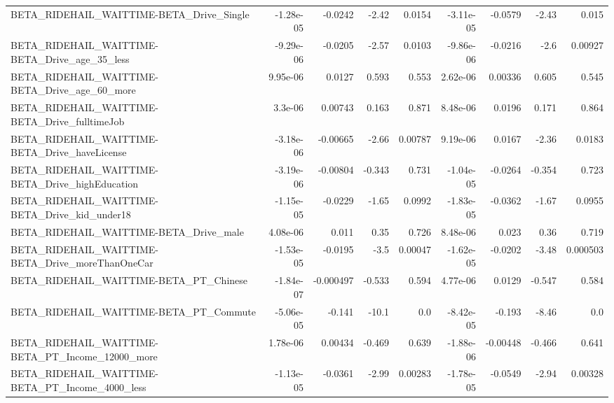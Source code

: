 \begin{tabular}{lrrrrrrrr}
BETA\_RIDEHAIL\_WAITTIME-BETA\_Drive\_Single           &   -1.28e-05 &      -0.0242 &    -2.42 &   0.0154 &  -3.11e-05 &     -0.0579 &        -2.43 &         0.015 \\
BETA\_RIDEHAIL\_WAITTIME-BETA\_Drive\_age\_35\_less      &   -9.29e-06 &      -0.0205 &    -2.57 &   0.0103 &  -9.86e-06 &     -0.0216 &         -2.6 &       0.00927 \\
BETA\_RIDEHAIL\_WAITTIME-BETA\_Drive\_age\_60\_more      &    9.95e-06 &       0.0127 &    0.593 &    0.553 &   2.62e-06 &     0.00336 &        0.605 &         0.545 \\
BETA\_RIDEHAIL\_WAITTIME-BETA\_Drive\_fulltimeJob      &     3.3e-06 &      0.00743 &    0.163 &    0.871 &   8.48e-06 &      0.0196 &        0.171 &         0.864 \\
BETA\_RIDEHAIL\_WAITTIME-BETA\_Drive\_haveLicense      &   -3.18e-06 &     -0.00665 &    -2.66 &  0.00787 &   9.19e-06 &      0.0167 &        -2.36 &        0.0183 \\
BETA\_RIDEHAIL\_WAITTIME-BETA\_Drive\_highEducation    &   -3.19e-06 &     -0.00804 &   -0.343 &    0.731 &  -1.04e-05 &     -0.0264 &       -0.354 &         0.723 \\
BETA\_RIDEHAIL\_WAITTIME-BETA\_Drive\_kid\_under18      &   -1.15e-05 &      -0.0229 &    -1.65 &   0.0992 &  -1.83e-05 &     -0.0362 &        -1.67 &        0.0955 \\
BETA\_RIDEHAIL\_WAITTIME-BETA\_Drive\_male             &    4.08e-06 &        0.011 &     0.35 &    0.726 &   8.48e-06 &       0.023 &         0.36 &         0.719 \\
BETA\_RIDEHAIL\_WAITTIME-BETA\_Drive\_moreThanOneCar   &   -1.53e-05 &      -0.0195 &     -3.5 &  0.00047 &  -1.62e-05 &     -0.0202 &        -3.48 &      0.000503 \\
BETA\_RIDEHAIL\_WAITTIME-BETA\_PT\_Chinese             &   -1.84e-07 &    -0.000497 &   -0.533 &    0.594 &   4.77e-06 &      0.0129 &       -0.547 &         0.584 \\
BETA\_RIDEHAIL\_WAITTIME-BETA\_PT\_Commute             &   -5.06e-05 &       -0.141 &    -10.1 &      0.0 &  -8.42e-05 &      -0.193 &        -8.46 &           0.0 \\
BETA\_RIDEHAIL\_WAITTIME-BETA\_PT\_Income\_12000\_more   &    1.78e-06 &      0.00434 &   -0.469 &    0.639 &  -1.88e-06 &    -0.00448 &       -0.466 &         0.641 \\
BETA\_RIDEHAIL\_WAITTIME-BETA\_PT\_Income\_4000\_less    &   -1.13e-05 &      -0.0361 &    -2.99 &  0.00283 &  -1.78e-05 &     -0.0549 &        -2.94 &       0.00328 \\

\end{tabular}
